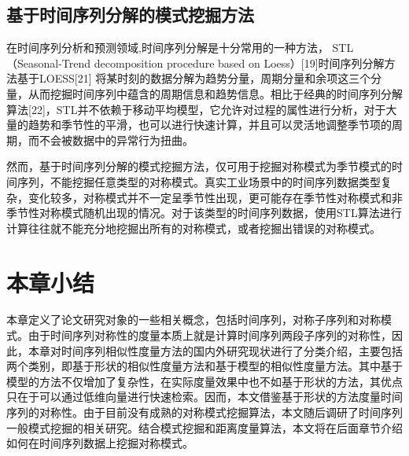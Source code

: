 \subsection{基于时间序列分解的模式挖掘方法}
在时间序列分析和预测领域,时间序列分解是十分常用的一种方法，
STL（Seasonal-Trend decomposition procedure based on Loess）[19]时间序列分解方法基于LOESS[21]
将某时刻的数据分解为趋势分量，周期分量和余项这三个分量，从而挖掘时间序列中蕴含的周期信息和趋势信息。相比于经典的时间序列分解算法[22]，STL并不依赖于移动平均模型，它允许对过程的属性进行分析，对于大量的趋势和季节性的平滑，也可以进行快速计算，并且可以灵活地调整季节项的周期，而不会被数据中的异常行为扭曲。

然而，基于时间序列分解的模式挖掘方法，仅可用于挖掘对称模式为季节模式的时间序列，不能挖掘任意类型的对称模式。真实工业场景中的时间序列数据类型复杂，变化较多，对称模式并不一定呈季节性出现，更可能存在季节性对称模式和非季节性对称模式随机出现的情况。对于该类型的时间序列数据，使用STL算法进行计算往往就不能充分地挖掘出所有的对称模式，或者挖掘出错误的对称模式。

\section{本章小结}
本章定义了论文研究对象的一些相关概念，包括时间序列，对称子序列和对称模式。由于时间序列对称性的度量本质上就是计算时间序列两段子序列的对称性，因此，本章对时间序列相似性度量方法的国内外研究现状进行了分类介绍，主要包括两个类别，即基于形状的相似性度量方法和基于模型的相似性度量方法。其中基于模型的方法不仅增加了复杂性，在实际度量效果中也不如基于形状的方法，其优点只在于可以通过低维向量进行快速检索。因而，本文借鉴基于形状的方法度量时间序列的对称性。由于目前没有成熟的对称模式挖掘算法，本文随后调研了时间序列一般模式挖掘的相关研究。结合模式挖掘和距离度量算法，本文将在后面章节介绍如何在时间序列数据上挖掘对称模式。